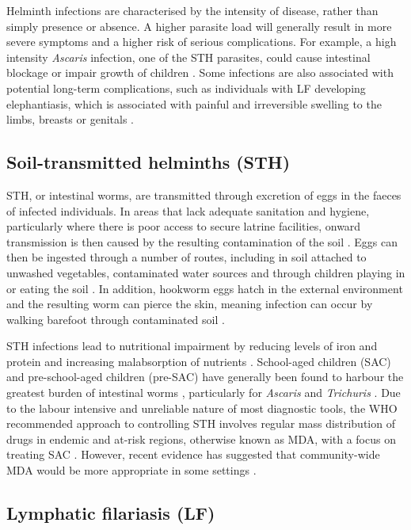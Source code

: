 Helminth infections are characterised by the intensity of disease, rather than simply presence or absence. A higher parasite load will generally result in more severe symptoms and a higher risk of serious complications. For example, a high intensity \textit{Ascaris} infection, one of the STH parasites, could cause intestinal blockage or impair growth of children \cite{WHO}. Some infections are also associated with potential long-term complications, such as individuals with LF developing elephantiasis, which is associated with painful and irreversible swelling to the limbs, breasts or genitals \cite{WHO2019_FactSheet}. 

\subsection{Soil-transmitted helminths (STH)}

STH, or intestinal worms, are transmitted through excretion of eggs in the faeces of infected individuals. In areas that lack adequate sanitation and hygiene, particularly where there is poor access to secure latrine facilities, onward transmission is then caused by the resulting contamination of the soil \cite{Bethony2006}. Eggs can then be ingested through a number of routes, including in soil attached to unwashed vegetables, contaminated water sources and through children playing in or eating the soil \cite{WHO}. In addition, hookworm eggs hatch in the external environment and the resulting worm can pierce the skin, meaning infection can occur by walking barefoot through contaminated soil \cite{Bethony2006,Truscott2017}.

STH infections lead to nutritional impairment by reducing levels of iron and protein and increasing malabsorption of nutrients \cite{WHO}. School-aged children (SAC) and pre-school-aged children (pre-SAC) have generally been found to harbour the greatest burden of intestinal worms \cite{Hotez2008}, particularly for \textit{Ascaris} and \textit{Trichuris} \cite{Anderson2015}. Due to the labour intensive and unreliable nature of most diagnostic tools, the WHO recommended approach to controlling STH involves regular mass distribution of drugs in endemic and at-risk regions, otherwise known as MDA, with a focus on treating SAC  \cite{WHO2017STH}. However, recent evidence has suggested that community-wide MDA would be more appropriate in some settings \cite{Anderson2015,Farrell2018}.

\subsection{Lymphatic filariasis (LF)}

